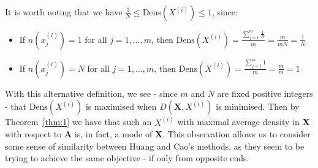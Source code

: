 \begin{remark}
    It is worth noting that we have \(\frac{1}{N} \leq \text{Dens}(X^{(i)})
    \leq 1\), since:		
	\begin{itemize}	
        \item If \(n(x_j^{(i)}) = 1\) for all \(j = 1, \ldots, m\), then
            \(\text{Dens}(X^{(i)}) = \frac{\sum_{j=1}^m \frac{1}{N}}{m} =
            \frac{m}{mN} = \frac{1}{N}\)
        \item If \(n(x_j^{(i)}) = N\) for all \(j = 1, \ldots, m\), then
            \(\text{Dens}(X^{(i)}) = \frac{\sum_{j=1}^m 1}{m} = \frac{m}{m} =
            1\)
	\end{itemize}
\end{remark}



\begin{remark}
    With this alternative definition, we see \-- since \(m\) and \(N\) are fixed
    positive integers \-- that \(\text{Dens}(X^{(i)})\) is maximised when
    \(D(\textbf{X}, X^{(i)})\) is minimised. Then by Theorem~\ref{thm:1} we have
    that such an \(X^{(i)}\) with maximal average density in \textbf{X} with
    respect to \textbf{A} is, in fact, a mode of \textbf{X}. This observation
    allows us to consider some sense of similarity between Huang and Cao's
    methods, as they seem to be trying to achieve the same objective \-- if only
    from opposite ends.
\end{remark}

%
